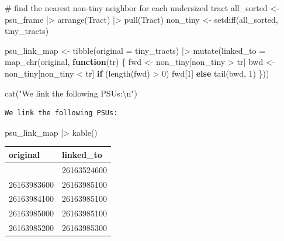 \documentclass[
  11pt,
]{article}
\newenvironment{Shaded}{\begin{snugshade}}{\end{snugshade}}
\newcommand{\AttributeTok}[1]{\textcolor[rgb]{0.40,0.45,0.13}{#1}}
\newcommand{\CommentTok}[1]{\textcolor[rgb]{0.37,0.37,0.37}{#1}}
\newcommand{\ControlFlowTok}[1]{\textcolor[rgb]{0.00,0.23,0.31}{\textbf{#1}}}
\newcommand{\DecValTok}[1]{\textcolor[rgb]{0.68,0.00,0.00}{#1}}
\newcommand{\FunctionTok}[1]{\textcolor[rgb]{0.28,0.35,0.67}{#1}}
\newcommand{\NormalTok}[1]{\textcolor[rgb]{0.00,0.23,0.31}{#1}}
\newcommand{\OtherTok}[1]{\textcolor[rgb]{0.00,0.23,0.31}{#1}}
\newcommand{\SpecialCharTok}[1]{\textcolor[rgb]{0.37,0.37,0.37}{#1}}
\newcommand{\StringTok}[1]{\textcolor[rgb]{0.13,0.47,0.30}{#1}}
\begin{document}
\begin{Shaded}
\begin{Highlighting}[]
\CommentTok{\# find the nearest non{-}tiny neighbor for each undersized tract}
\NormalTok{all\_sorted }\OtherTok{\textless{}{-}}\NormalTok{ psu\_frame }\SpecialCharTok{|\textgreater{}} \FunctionTok{arrange}\NormalTok{(Tract) }\SpecialCharTok{|\textgreater{}} \FunctionTok{pull}\NormalTok{(Tract)}
\NormalTok{non\_tiny }\OtherTok{\textless{}{-}} \FunctionTok{setdiff}\NormalTok{(all\_sorted, tiny\_tracts)}

\NormalTok{psu\_link\_map }\OtherTok{\textless{}{-}} \FunctionTok{tibble}\NormalTok{(}\AttributeTok{original =}\NormalTok{ tiny\_tracts) }\SpecialCharTok{|\textgreater{}}
  \FunctionTok{mutate}\NormalTok{(}\AttributeTok{linked\_to =} \FunctionTok{map\_chr}\NormalTok{(original, }\ControlFlowTok{function}\NormalTok{(tr) \{}
\NormalTok{    fwd }\OtherTok{\textless{}{-}}\NormalTok{ non\_tiny[non\_tiny }\SpecialCharTok{\textgreater{}}\NormalTok{ tr]}
\NormalTok{    bwd }\OtherTok{\textless{}{-}}\NormalTok{ non\_tiny[non\_tiny }\SpecialCharTok{\textless{}}\NormalTok{ tr]}
    \ControlFlowTok{if}\NormalTok{ (}\FunctionTok{length}\NormalTok{(fwd) }\SpecialCharTok{\textgreater{}} \DecValTok{0}\NormalTok{) fwd[}\DecValTok{1}\NormalTok{] }\ControlFlowTok{else} \FunctionTok{tail}\NormalTok{(bwd, }\DecValTok{1}\NormalTok{)}
\NormalTok{  \}))}

\FunctionTok{cat}\NormalTok{(}\StringTok{"We link the following PSUs:}\SpecialCharTok{\textbackslash{}n}\StringTok{"}\NormalTok{)}
\end{Highlighting}
\end{Shaded}

\begin{verbatim}
We link the following PSUs:
\end{verbatim}

\begin{Shaded}
\begin{Highlighting}[]
\NormalTok{psu\_link\_map }\SpecialCharTok{|\textgreater{}} \FunctionTok{kable}\NormalTok{()}
\end{Highlighting}
\end{Shaded}

\begin{longtable}[]{@{}ll@{}}
\toprule\noalign{}
original & linked\_to \\
\midrule\noalign{}
\endhead
\bottomrule\noalign{}
\endlastfoot
26163524500 & 26163524600 \\
26163983600 & 26163985100 \\
26163984100 & 26163985100 \\
26163985000 & 26163985100 \\
26163985200 & 26163985300 \\
\end{longtable}
\end{document}
